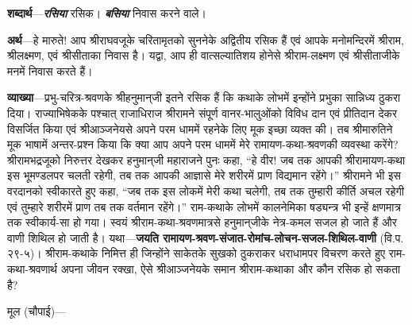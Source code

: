\parasepone
{}
\begin{sloppypar}\justifying{}
\textbf{शब्दार्थ}—\textbf{\textit{रसिया}} {} रसिक। \textbf{\textit{बसिया}} {} निवास करने वाले।
\end{sloppypar}
\begin{sloppypar}\justifying{}
\textbf{अर्थ}—हे मारुते! आप श्रीराघवजूके चरितामृतको सुननेके अद्वितीय रसिक हैं एवं आपके मनोमन्दिरमें श्रीराम, श्रीलक्ष्मण, एवं श्रीसीताका निवास है। यद्वा, आप ही वात्सल्यातिशय होनेसे श्रीराम-लक्ष्मण एवं श्रीसीताजीके मनमें निवास करते हैं।
\end{sloppypar}
\parasepone
\begin{sloppypar}\justifying{}
\textbf{व्याख्या}—प्रभु-चरित्र-श्रवणके श्रीहनुमान्‌जी इतने रसिक हैं कि कथाके लोभमें इन्होंने प्रभुका सान्निध्य ठुकरा दिया। राज्याभिषेकके पश्चात् राजाधिराज श्रीरामने संपूर्ण वानर-भालुओंको विविध दान एवं प्रीतिदान देकर विसर्जित किया एवं श्रीआञ्जनेयसे अपने परम धाममें रहनेके लिए मूक इच्छा व्यक्त की। तब श्रीमारुतिने मूक भाषामें अन्तर-प्रश्न किया कि क्या आप अपने परम धाममें मेरे रामायण-कथा-श्रवणकी व्यवस्था करेंगे? श्रीरामभद्रजूको निरुत्तर देखकर हनुमान्‌जी महाराजने पुनः कहा, “हे वीर! जब तक आपकी श्रीरामायण-कथा इस भूमण्डलपर चलती रहेगी, तब तक आपकी आज्ञासे मेरे शरीरमें प्राण विद्यमान रहेंगे।” श्रीरामने भी इस वरदानको स्वीकारते हुए कहा, “जब तक इस लोकमें मेरी कथा चलेगी, तब तक तुम्हारी कीर्ति अचल रहेगी एवं तुम्हारे शरीरमें प्राण तब तक वर्तमान रहेंगे।” राम-कथाके लोभमें कालनेमिका षड्यन्त्र भी इन्हें क्षणमात्र तक स्वीकार्य-सा हो गया। स्वयं श्रीराम-कथा-श्रवणमात्रसे हनुमान्‌जीके नेत्र-कमल सजल हो जाते हैं और वाणी शिथिल हो जाती है। यथा—\textbf{जयति रामायण-श्रवण-संजात-रोमांच-लोचन-सजल-शिथिल-वाणी} (वि.प. २९-५)। श्रीराम-कथाके निमित्त ही जिन्होंने साकेतके सुखको ठुकराकर धराधामपर विचरण करते हुए राम-कथा-श्रवणार्थ अपना जीवन रक्खा, ऐसे श्रीआञ्जनेयके समान श्रीराम-कथाका और कौन रसिक हो सकता है?
\end{sloppypar}
\paraseplotus
\pagebreak


{}
\begin{sloppypar}\justifying{}
मूल (चौपाई)—
\end{sloppypar}

